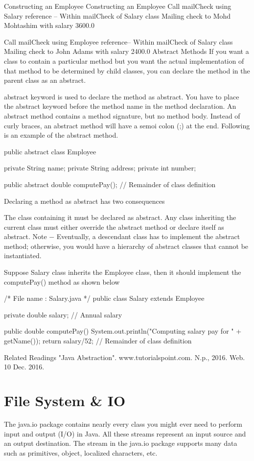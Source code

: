 Constructing an Employee
Constructing an Employee
Call mailCheck using Salary reference --
Within mailCheck of Salary class
Mailing check to Mohd Mohtashim with salary 3600.0

Call mailCheck using Employee reference--
Within mailCheck of Salary class
Mailing check to John Adams with salary 2400.0
Abstract Methods
If you want a class to contain a particular method but you want the actual implementation of that method to be determined by child classes, you can declare the method in the parent class as an abstract.

abstract keyword is used to declare the method as abstract.
You have to place the abstract keyword before the method name in the method declaration.
An abstract method contains a method signature, but no method body.
Instead of curly braces, an abstract method will have a semoi colon (;) at the end.
Following is an example of the abstract method.

public abstract class Employee {
   private String name;
   private String address;
   private int number;

   public abstract double computePay();
   // Remainder of class definition
}
Declaring a method as abstract has two consequences

The class containing it must be declared as abstract.
Any class inheriting the current class must either override the abstract method or declare itself as abstract.
Note − Eventually, a descendant class has to implement the abstract method; otherwise, you would have a hierarchy of abstract classes that cannot be instantiated.

Suppose Salary class inherits the Employee class, then it should implement the computePay() method as shown below

/* File name : Salary.java */
public class Salary extends Employee {
   private double salary;   // Annual salary

   public double computePay() {
      System.out.println("Computing salary pay for " + getName());
      return salary/52;
   }
   // Remainder of class definition
}
Related Readings
"Java Abstraction". www.tutorialspoint.com. N.p., 2016. Web. 10 Dec. 2016.

\section{File System & IO}

The java.io package contains nearly every class you might ever need to perform input and output (I/O) in Java. All these streams represent an input source and an output destination. The stream in the java.io package supports many data such as primitives, object, localized characters, etc.

